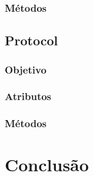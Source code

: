 \documentclass[10pt]{article}
\begin{document}
\begin{itemize}
        \subsubsection{\large Métodos}
        
    \subsection{\Large Protocol}
        \subsubsection{\large Objetivo}
        \subsubsection{\large Atributos}
        \subsubsection{\large Métodos}
    \end{itemize}

\section{Conclusão}
\end{document}
